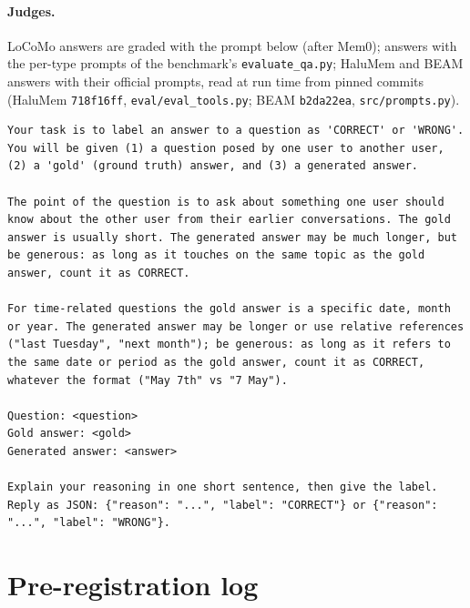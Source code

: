 \paragraph{Judges.}
LoCoMo answers are graded with the prompt below (after Mem0); \lme{} answers with the per-type prompts of the benchmark's \texttt{evaluate\_qa.py}; HaluMem and BEAM answers with their official prompts, read at run time from pinned commits (HaluMem \texttt{718f16ff}, \texttt{eval/eval\_tools.py}; BEAM \texttt{b2da22ea}, \texttt{src/prompts.py}).
\begin{lstlisting}
Your task is to label an answer to a question as 'CORRECT' or 'WRONG'. You will be given (1) a question posed by one user to another user, (2) a 'gold' (ground truth) answer, and (3) a generated answer.

The point of the question is to ask about something one user should know about the other user from their earlier conversations. The gold answer is usually short. The generated answer may be much longer, but be generous: as long as it touches on the same topic as the gold answer, count it as CORRECT.

For time-related questions the gold answer is a specific date, month or year. The generated answer may be longer or use relative references ("last Tuesday", "next month"); be generous: as long as it refers to the same date or period as the gold answer, count it as CORRECT, whatever the format ("May 7th" vs "7 May").

Question: <question>
Gold answer: <gold>
Generated answer: <answer>

Explain your reasoning in one short sentence, then give the label. Reply as JSON: {"reason": "...", "label": "CORRECT"} or {"reason": "...", "label": "WRONG"}.
\end{lstlisting}

\section{Pre-registration log}
\label{app:prereg}

